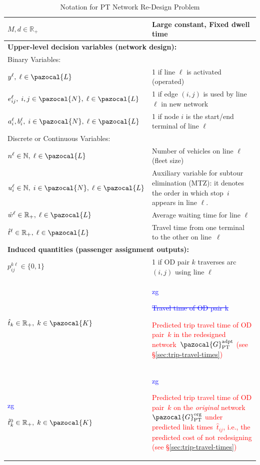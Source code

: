 \documentclass[a4paper,fleqn]{cas-sc}
\newcommand{\stkout}[1]{\ifmmode\text{\sout{\ensuremath{#1}}}\else\sout{#1}\fi}
\newcommand\rev[3]{\textcolor{blue}{\begin{scriptsize}{#1}\end{scriptsize}\stkout{#2}}\textcolor{red}{#3}}
\newcommand\rev[3]{\ignorespaces#3\ignorespaces\unskip}
\begin{document}
\begin{table}
\begin{tabular}{p{} p{}}
$M, d \in \mathbb{R}_{+}$ & Large constant, Fixed dwell time \\
\midrule
\multicolumn{2}{l}{\textbf{Upper-level decision variables (network design):}} \\
\midrule
\multicolumn{2}{l}{Binary Variables:} \\
\midrule
$y^\ell,\; \ell \in \pazocal{L}$ & 1 if line $\ell$ is activated (operated) \\
$e_{ij}^\ell,\; i,j \in \pazocal{N},\; \ell \in \pazocal{L}$ & 1 if edge $(i,j)$ is used by line $\ell$ in new network \\
$a_i^\ell, b_i^\ell,\; i \in \pazocal{N},\; \ell \in \pazocal{L}$ & 1 if node $i$ is the start/end terminal of line $\ell$ \\
\midrule
\multicolumn{2}{l}{Discrete or Continuous Variables:} \\
\midrule
$n^\ell \in \mathbb{N},\; \ell \in \pazocal{L}$ & Number of vehicles on line $\ell$ (fleet size) 
\\

$u_i^\ell \in \mathbb{N},\; i \in \pazocal{N},\; \ell \in \pazocal{L}$ 
& Auxiliary variable for subtour elimination (MTZ): it denotes the order in which stop~$i$ appears in line $\ell$.
\\
$\hat{w}^\ell \in \mathbb{R}_{+},\; \ell \in \pazocal{L}$ & Average waiting time for line $\ell$ \\
$\hat{t}^\ell \in \mathbb{R}_{+},\; \ell \in \pazocal{L}$ & Travel time from one terminal to the other on line~$\ell$ \\
\midrule
\multicolumn{2}{l}{\textbf{Induced quantities (passenger assignment outputs):}} \\
\midrule
$p_{ij}^{k\ell} \in \{0,1\}$ & 1 if OD pair $k$ traverses arc $(i,j)$ using line $\ell$ \\
$\hat{t}_k \in \mathbb{R}_{+},\; k \in \pazocal{K}$ & \rev{zg}{Travel time of OD pair k}{Predicted trip travel time of OD pair~$k$ in the redesigned network~$\pazocal{G}_\text{PT}^\text{adpt}$ (see \S{}\ref{sec:trip-travel-times})} \\
\rev{zg}{}{$\hat{t}^0_k \in \mathbb{R}_{+},\; k \in \pazocal{K}$} & \rev{zg}{}{Predicted trip travel time of OD pair~$k$ on the \emph{original} network~$\pazocal{G}_\text{PT}^\text{org}$ under predicted link times~$\hat{t}_{ij}$, i.e., the predicted cost of not redesigning (see \S{}\ref{sec:trip-travel-times})} \\
\bottomrule
\end{tabular}
\caption{Notation for PT Network Re-Design Problem}
\label{tab:notation}
\end{table}
\end{document}
